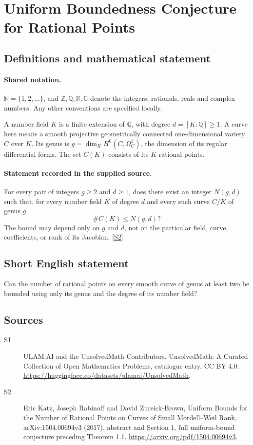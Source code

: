 \documentclass[11pt]{article}
\newcommand{\sref}[2]{\hyperlink{source:#1:#2}{[S#2]}}
\begin{document}
\section{Uniform Boundedness Conjecture for Rational Points}\label{statement}

\subsection{Definitions and mathematical statement}

\paragraph{Shared notation.}$\mathbb N=\{1,2,\ldots\}$, and $\mathbb Z,\mathbb Q,\mathbb R,\mathbb C$ denote the integers, rationals, reals and complex numbers. Any other conventions are specified locally.


A number field $K$ is a finite extension of $\mathbb Q$, with degree $d=[K:\mathbb Q]\ge1$. A curve here means a smooth projective geometrically connected one-dimensional variety $C$ over $K$. Its genus is $g=\dim_K H^0(C,\Omega_C^1)$, the dimension of its regular differential forms. The set $C(K)$ consists of its $K$-rational points.
\paragraph{Statement recorded in the supplied source.}
For every pair of integers $g\ge2$ and $d\ge1$, does there exist an integer $N(g,d)$ such that, for every number field $K$ of degree $d$ and every such curve $C/K$ of genus $g$,
\[
 \#C(K)\le N(g,d)?
\]
The bound may depend only on $g$ and $d$, not on the particular field, curve, coefficients, or rank of its Jacobian. \sref{statement}{2}
\subsection{Short English statement}
Can the number of rational points on every smooth curve of genus at least two be bounded using only its genus and the degree of its number field?
\subsection{Sources}
\begin{description}
\item[\hypertarget{source:statement:1}{S1}] ULAM.AI and the UnsolvedMath Contributors, UnsolvedMath: A Curated Collection of Open Mathematics Problems, catalogue entry. CC BY 4.0. \url{https://huggingface.co/datasets/ulamai/UnsolvedMath}.
\item[\hypertarget{source:statement:2}{S2}] Eric Katz, Joseph Rabinoff and David Zureick-Brown, Uniform Bounds for the Number of Rational Points on Curves of Small Mordell–Weil Rank, arXiv:1504.00694v3 (2017), abstract and Section 1, full uniform-bound conjecture preceding Theorem 1.1. \url{https://arxiv.org/pdf/1504.00694v3}.
\end{description}
\label{end:statement}
\end{document}
